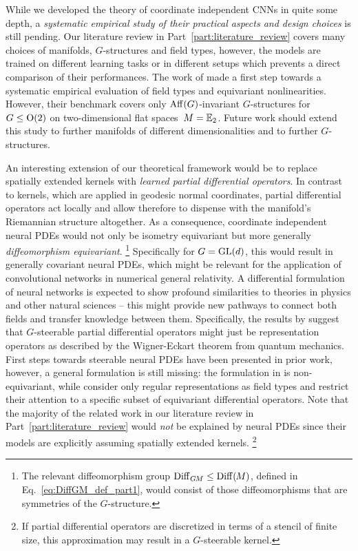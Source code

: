 While we developed the theory of coordinate independent CNNs in quite some depth, a \emph{systematic empirical study of their practical aspects and design choices} is still pending.
Our literature review in Part~\ref{part:literature_review} covers many choices of manifolds, $G$-structures and field types, however, the models are trained on different learning tasks or in different setups which prevents a direct comparison of their performances.
The work of \citet{Weiler2019_E2CNN} made a first step towards a systematic empirical evaluation of field types and equivariant nonlinearities.
However, their benchmark covers only $\operatorname{Aff}(G)$-invariant $G$-structures for $G\leq\operatorname{O}(2)$ on two-dimensional flat spaces~$M=\mathbb{E}_2$.
Future work should extend this study to further manifolds of different dimensionalities and to further $G$-structures.


An interesting extension of our theoretical framework would be to replace spatially extended kernels with \emph{learned partial differential operators}.
In contrast to kernels, which are applied in geodesic normal coordinates, partial differential operators act locally and allow therefore to dispense with the manifold's Riemannian structure altogether.
As a consequence, coordinate independent neural PDEs would not only be isometry equivariant but more generally \emph{diffeomorphism equivariant}.%
\footnote{
    The relevant diffeomorphism group $\operatorname{Diff}_{G\mkern-1.4muM}\leq\operatorname{Diff}(\mkern-1.5mu M \mkern-.5mu)$, defined in Eq.~\eqref{eq:DiffGM_def_part1}, would consist of those diffeomorphisms that are symmetries of the $G$-structure.
}
Specifically for $G=\operatorname{GL}(d)$, this would result in generally covariant neural PDEs, which might be relevant for the application of convolutional networks in numerical general relativity.
A differential formulation of neural networks is expected to show profound similarities to theories in physics and other natural sciences -- this might provide new pathways to connect both fields and transfer knowledge between them.
Specifically, the results by \citet{lang2020WignerEckart} suggest that $G$-steerable partial differential operators might just be representation operators as described by the Wigner-Eckart theorem from quantum mechanics.
First steps towards steerable neural PDEs have been presented in prior work, however, a general formulation is still missing:
the formulation in \cite{jiang2019spherical} is non-equivariant, while \cite{shen2020PDOeConvs,shen2021PDOeSpherical} consider only regular representations as field types and \cite{smets2020pde,sharp2020diffusion} restrict their attention to a specific subset of equivariant differential operators.
Note that the majority of the related work in our literature review in Part~\ref{part:literature_review} would \emph{not} be explained by neural PDEs since their models are explicitly assuming spatially extended kernels.%
\footnote{
    If partial differential operators are discretized in terms of a stencil of finite size, this approximation may result in a $G$-steerable kernel.
}


